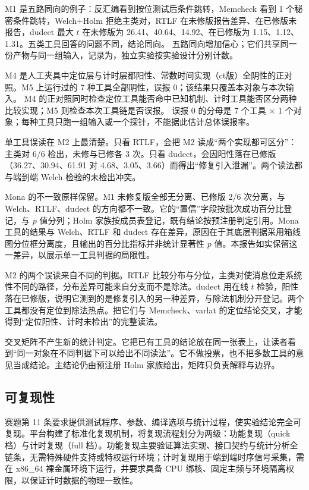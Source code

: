 M1 是五路同向的例子：反汇编看到按位测试后条件跳转，Memcheck 看到 1 个秘密条件跳转，Welch+Holm 拒绝主类对，RTLF 在未修版报告差异、在已修版未报告，dudect 最大 $t$ 在未修版为 26.41、40.64、14.92、在已修版为 1.15、1.12、1.31。五类工具回答的问题不同，结论同向。
五路同向增加信心；它们共享同一份产物与同一组输入，记录为，独立实验按实验设计分别计数。

M4 是人工夹具中定位层与计时层都阳性、常数时间实现（ct版）全阴性的正对照。M5 上运行过的 7 种工具全部阴性，误报 0；该结果只覆盖本对象与本次输入。
M4 的正对照同时检查定位工具能否命中已知机制、计时工具能否区分两种比较实现；M5 则检查本次工具链是否误报。
误报 0 的分母是 7 个工具 $\times$ 1 个对象；每种工具只跑一组输入或一个探针，不能据此估计总体误报率。

单工具误读在 M2 上最清楚。只看 RTLF，会把 M2 读成“两个实现都可区分”：主类对 6/6 检出，未修与已修各 3 次。只看 dudect，会因阳性落在已修版（36.27、30.94、61.91 对 4.68、3.05、3.66）而得出“修复引入泄漏”。两个读法都与端到端 Welch 检验的未检出冲突。\cite{dudect}

Mona 的不一致原样保留。M1 未修复版全部无分离、已修版 2/6 次分离，与 Welch、RTLF、dudect 的方向都不一致。它的“置信”字段按批次成功百分比登记，与 $p$ 值分列；Holm 家族按成员表登记，既有结论按预注册判定引用。Mona 工具的结果与 Welch、RTLF 和 dudect 存在差异，原因在于其底层判据采用箱线图分位框分离度，且输出的百分比指标并非统计显著性 $p$ 值。本报告如实保留这一差异，以展示单一工具判据的局限性。

M2 的两个误读来自不同的判据。RTLF 比较分布与分位，主类对使消息位走系统性不同的路径，分布差异可能来自分支而不是除法。dudect 用在线 $t$ 检验，阳性落在已修版，说明它测到的是修复引入的另一种差异，与除法机制分开登记。两个工具都没有定位到除法热点。把它们与 Memcheck、varlat 的定位结论交叉，才能得到“定位阳性、计时未检出”的完整读法。





交叉矩阵不产生新的统计判定。它把已有工具的结论放在同一张表上，让读者看到“同一对象在不同判据下可以给出不同读法”。它不做投票，也不把多数工具的意见当成结论。主结论仍由预注册 Holm 家族给出，矩阵只负责解释与边界。

\subsection{可复现性}

赛题第 11 条要求提供测试程序、参数、编译选项与统计过程，使实验结论完全可复现。平台构建了标准化复现机制，将复现流程划分为两级：功能复现（quick 档）与计时复现（full 档）。功能复现主要验证算法实现、接口契约与统计分析全链条，无需特殊硬件支持或特权运行环境；计时复现用于端到端时序信号采集，需在 x86\_64 裸金属环境下运行，并要求具备 CPU 绑核、固定主频与环境隔离权限，以保证计时数据的物理一致性。

